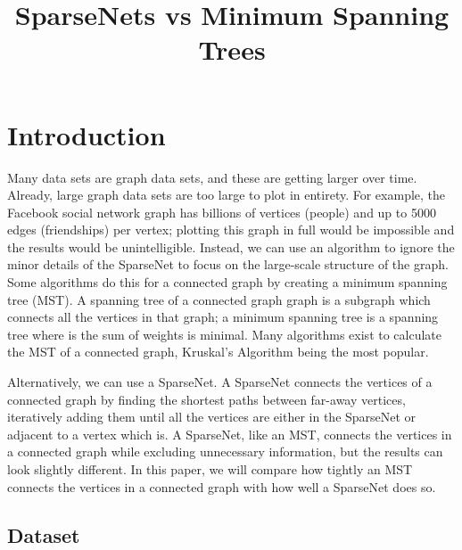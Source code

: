 \documentclass[conference]{IEEEtran}
\begin{document}
\title{SparseNets vs Minimum Spanning Trees}

\author{
}

\maketitle

\section{Introduction}

Many data sets are graph data sets, and these are getting larger over time.
Already, large graph data sets are too large to plot in entirety.
For example, the Facebook social network graph has billions of vertices (people) and up to 5000 edges (friendships) per vertex; plotting this graph in full would be impossible and the results would be unintelligible.
Instead, we can use an algorithm to ignore the minor details of the SparseNet to focus on the large-scale structure of the graph.
Some algorithms do this for a connected graph by creating a minimum spanning tree (MST).
A spanning tree of a connected graph graph is a subgraph which connects all the vertices in that graph; a minimum spanning tree is a spanning tree where is the sum of weights is minimal.
Many algorithms exist to calculate the MST of a connected graph, Kruskal's Algorithm being the most popular.

Alternatively, we can use a SparseNet.
A SparseNet connects the vertices of a connected graph by finding the shortest paths between far-away vertices, iteratively adding them until all the vertices are either in the SparseNet or adjacent to a vertex which is.
A SparseNet, like an MST, connects the vertices in a connected graph while excluding unnecessary information, but the results can look slightly different.
In this paper, we will compare how tightly an MST connects the vertices in a connected graph with how well a SparseNet does so.


\subsection{Dataset}
\end{document}
